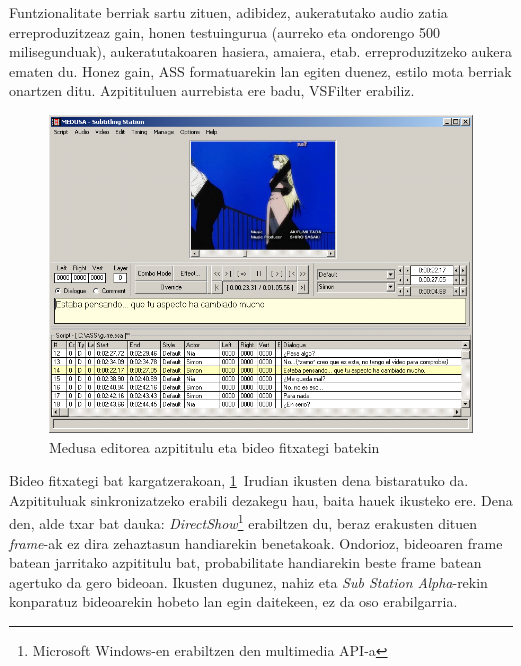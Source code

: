 Funtzionalitate berriak sartu zituen, adibidez, aukeratutako audio zatia erreproduzitzeaz gain, honen testuingurua (aurreko eta ondorengo 500 milisegunduak), aukeratutakoaren hasiera, amaiera, etab. erreproduzitzeko aukera ematen du. Honez gain, ASS formatuarekin lan egiten duenez, estilo mota berriak onartzen ditu. Azpitituluen aurrebista ere badu, VSFilter erabiliz.
\begin{figure}[htb]
\begin{center}
\includegraphics[width=\columnwidth, natwidth=800pt, natheight=600pt]{Pictures/Chapter2/medusa-bideo.png}
\caption{Medusa editorea azpititulu eta bideo fitxategi batekin}
\label{medusa-bideo}
\end{center}
\end{figure}

Bideo fitxategi bat kargatzerakoan, \ref{medusa-bideo}~Irudian ikusten dena bistaratuko da. Azpitituluak sinkronizatzeko erabili dezakegu hau, baita hauek ikusteko ere. Dena den, alde txar bat dauka: \textit{DirectShow}\footnote{Microsoft Windows-en erabiltzen den multimedia API-a} erabiltzen du, beraz erakusten dituen \textit{frame}-ak ez dira zehaztasun handiarekin benetakoak. Ondorioz, bideoaren frame batean jarritako azpititulu bat, probabilitate handiarekin beste frame batean agertuko da gero bideoan. Ikusten dugunez, nahiz eta \textit{Sub Station Alpha}-rekin konparatuz bideoarekin hobeto lan egin daitekeen, ez da oso erabilgarria.

